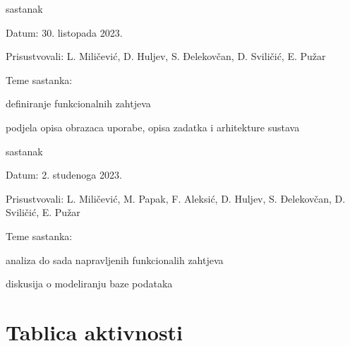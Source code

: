 \begin{packed_enum}
			\item  sastanak
			\item[] \begin{packed_item}
				\item Datum: 30. listopada 2023.
				\item Prisustvovali: L. Miličević, D. Huljev, S. Đelekovčan, D. Sviličić, E. Pužar
				\item Teme sastanka:
				\begin{packed_item}
					\item  definiranje funkcionalnih zahtjeva
					\item  podjela opisa obrazaca uporabe, opisa zadatka i arhitekture sustava
				\end{packed_item}
			\end{packed_item}

			\item  sastanak
			\item[] \begin{packed_item}
				\item Datum: 2. studenoga 2023.
				\item Prisustvovali: L. Miličević, M. Papak, F. Aleksić, D. Huljev, S. Đelekovčan, D. Sviličić, E. Pužar
				\item Teme sastanka:
				\begin{packed_item}
					\item  analiza do sada napravljenih funkcionalih zahtjeva
					\item  diskusija o modeliranju baze podataka
				\end{packed_item}
			\end{packed_item}
			
			
		\end{packed_enum}
		
		\eject
		\section*{Tablica aktivnosti}
		
			

